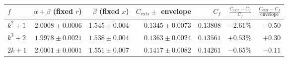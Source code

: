 \begin{tabular}{lrrrrrr}
\toprule
$f$ & $\alpha+\beta$ (fixed $r$) & $\beta$ (fixed $x$) & $C_{\mathrm{extr}}\pm$ envelope & $C_f$ & $\frac{C_{\mathrm{extr}}-C_f}{C_f}$ & $\frac{C_{\mathrm{extr}}-C_f}{\mathrm{envelope}}$ \\
\midrule
$k^2+1$ & $2.0008\pm0.0006$ & $1.545\pm0.004$ & $0.1345\pm0.0073$ & $0.13808$ & $-2.61\%$ & $-0.50$ \\
$k^3+2$ & $1.9978\pm0.0021$ & $1.538\pm0.004$ & $0.1363\pm0.0024$ & $0.13561$ & $+0.53\%$ & $+0.30$ \\
$2k+1$ & $2.0001\pm0.0001$ & $1.551\pm0.007$ & $0.1417\pm0.0082$ & $0.14261$ & $-0.65\%$ & $-0.11$ \\
\bottomrule
\end{tabular}
